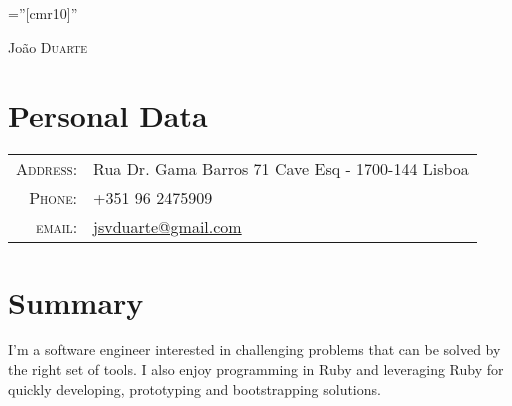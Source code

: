 \documentclass[a4paper,10pt]{article}
\begin{document}
\pagestyle{empty} %

\font\fb=''[cmr10]'' %

\par{\centering
  {\Huge João \textsc{Duarte}
}\bigskip\par}

\section{Personal Data}

\begin{tabular}{rl}
    \textsc{Address:}   & Rua Dr. Gama Barros 71 Cave Esq - 1700-144 Lisboa\\
    \textsc{Phone:}     & +351 96 2475909\\
    \textsc{email:}     & \href{mailto:jsvduarte@gmail.com}{jsvduarte@gmail.com} \\
\end{tabular}

\section{Summary}
I'm a software engineer interested in challenging problems that can be solved by
the right set of tools. I also enjoy programming in Ruby and leveraging Ruby for quickly
developing, prototyping and bootstrapping solutions.

\end{document}
